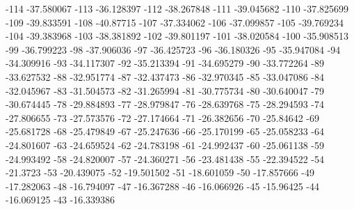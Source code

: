 -114                      -37.580067
-113                      -36.128397
-112                      -38.267848
-111                      -39.045682
-110                      -37.825699
-109                      -39.833591
-108                       -40.87715
-107                      -37.334062
-106                      -37.099857
-105                      -39.769234
-104                      -39.383968
-103                      -38.381892
-102                      -39.801197
-101                      -38.020584
-100                      -35.908513
-99                      -36.799223
-98                      -37.906036
-97                      -36.425723
-96                      -36.180326
-95                      -35.947084
-94                      -34.309916
-93                      -34.117307
-92                      -35.213394
-91                      -34.695279
-90                      -33.772264
-89                      -33.627532
-88                      -32.951774
-87                      -32.437473
-86                      -32.970345
-85                      -33.047086
-84                      -32.045967
-83                      -31.504573
-82                      -31.265994
-81                      -30.775734
-80                      -30.640047
-79                      -30.674445
-78                      -29.884893
-77                      -28.979847
-76                      -28.639768
-75                      -28.294593
-74                      -27.806655
-73                      -27.573576
-72                      -27.174664
-71                      -26.382656
-70                       -25.84642
-69                      -25.681728
-68                      -25.479849
-67                      -25.247636
-66                      -25.170199
-65                      -25.058233
-64                      -24.801607
-63                      -24.659524
-62                      -24.783198
-61                      -24.992437
-60                      -25.061138
-59                      -24.993492
-58                      -24.820007
-57                      -24.360271
-56                      -23.481438
-55                      -22.394522
-54                        -21.3723
-53                      -20.439075
-52                      -19.501502
-51                      -18.601059
-50                      -17.857666
-49                      -17.282063
-48                      -16.794097
-47                      -16.367288
-46                      -16.066926
-45                       -15.96425
-44                      -16.069125
-43                      -16.339386
